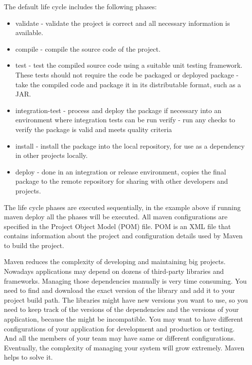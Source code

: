   The default life cycle includes the following phases:
  \begin{itemize}
    \item validate - validate the project is correct and all necessary
    information is available.
    \item compile - compile the source code of the project.
    \item test - test the compiled source code using a suitable unit testing
    framework. These tests should not require the code be packaged or deployed
    package - take the compiled code and package it in its distributable format,
    such as a JAR.
    \item integration-test - process and deploy the package if necessary into an
    environment where integration tests can be run verify - run any checks to
    verify the package is valid and meets quality criteria
    \item install - install the package into the local repository, for use as a
      dependency in other projects locally.
    \item  deploy - done in an integration or
    release environment, copies the final package to the remote repository for
    sharing with other developers and projects.
  \end{itemize}
  
  The life cycle phases are executed sequentially, in the example above if
  running maven deploy all the phases will be executed. All maven configurations are specified in the Project Object Model (POM) file.
  POM is an XML file that contains information about the project and configuration details used by Maven 
  to build the project. 

  Maven reduces the complexity of developing and maintaining big projects.
  Nowadays applications may depend on dozens of third-party libraries and
  frameworks. Managing those dependencies manually is very time consuming. You
  need to find and download the exact version of the library and add it to your project build path.
  The libraries might have new versions you want to use, so you need to keep track of the versions
  of the dependencies and the versions of your application, because the might be incompatible. 
  You may want to have different configurations of your application for development and production or testing.
  And all the members of your team may have same or different configurations.
  Eventually, the complexity of managing your system will grow extremely. Maven helps to solve it.

